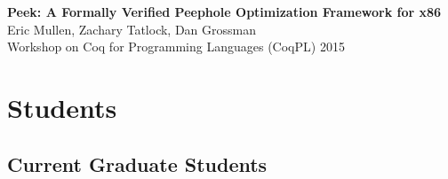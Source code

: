 \documentclass[10pt]{article}
\begin{document}
\textbf{%
Peek: A Formally Verified Peephole Optimization Framework for x86
} \\
Eric Mullen, Zachary Tatlock, Dan Grossman \\
Workshop on Coq for Programming Languages (CoqPL) 2015 \\




\section*{Students}

\subsection*{Current Graduate Students}
\end{document}
